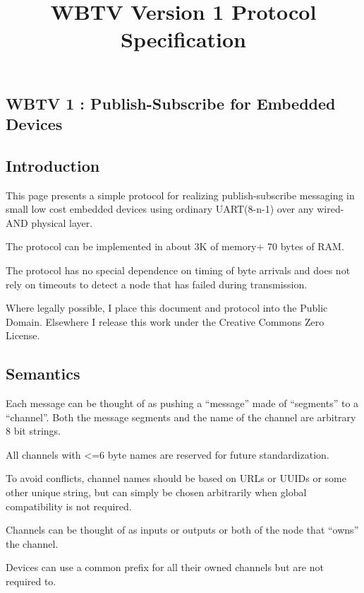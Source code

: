 \documentclass{article}
\title{WBTV Version 1 Protocol Specification}
\begin{document}
\section[]{}
\begin{center}
\begin{minipage}{6.8445in}
\section{WBTV 1 : Publish-Subscribe for Embedded Devices}
\end{minipage}
\end{center}
\subsection{Introduction}
This page presents a simple protocol for realizing publish-subscribe messaging in small low cost embedded devices using ordinary UART(8-n-1) over any wired-AND physical layer.

The protocol can be implemented in about 3K of memory+ 70 bytes of RAM.

The protocol has no special dependence on timing of byte arrivals and does not rely on timeouts to detect a node that has failed during transmission. 

Where legally possible, I place this document and protocol into the Public Domain. Elsewhere I release this work under the Creative Commons Zero License.

\subsection{Semantics}
Each message can be thought of as pushing a {\textquotedblleft}message{\textquotedblright} made of {\textquotedblleft}segments{\textquotedblright} to a {\textquotedblleft}channel{\textquotedblright}. Both the message segments and the name of the channel are arbitrary 8 bit strings. 

All channels with {\textless}=6 byte names are reserved for future standardization. 

To avoid conflicts, channel names should be based on URLs or UUIDs or some other unique string, but can simply be chosen arbitrarily when global compatibility is not required.

Channels can be thought of as inputs or outputs or both of the node that {\textquotedblleft}owns{\textquotedblright} the channel. 

Devices can use a common prefix for all their owned channels but are not required to.
\end{document}
